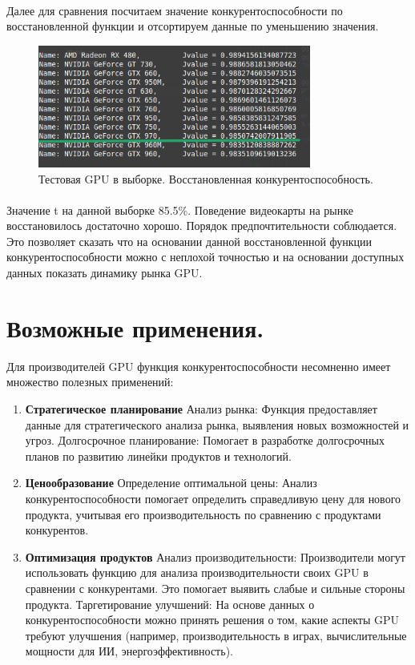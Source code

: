 \documentclass[14pt, a4paper]{extarticle}
\begin{document}
\paragraph{}
\newpage
Далее для сравнения посчитаем значение конкурентоспособности по восстановленной функции и отсортируем данные по уменьшению значения.
\begin{figure}[h]
    \centering
    \includegraphics[width=0.8\textwidth]{./img/linear/test_restored.png}
    \caption{Тестовая GPU в выборке. Восстановленная конкурентоспособность.}
    \label{fig:example}
\end{figure}
\paragraph{}
Значение t на данной выборке 85.5\%. Поведение видеокарты на рынке восстановилось достаточно хорошо. Порядок предпочтительности соблюдается. Это позволяет сказать что на основании данной восстановленной функции конкурентоспособности можно с неплохой точностью и на основании доступных данных показать динамику рынка GPU.
\newpage
\section{Возможные применения.}
Для производителей GPU функция конкурентоспособности несомненно имеет множество полезных применений:
\begin{enumerate}
  \item\textbf{Стратегическое планирование}
  \subitem Анализ рынка: Функция предоставляет данные для стратегического анализа рынка, выявления новых возможностей и угроз.
  \subitem Долгосрочное планирование: Помогает в разработке долгосрочных планов по развитию линейки продуктов и технологий.
  \item\textbf{Ценообразование}
  \subitem Определение оптимальной цены: Анализ конкурентоспособности помогает определить справедливую цену для нового продукта, учитывая его производительность по сравнению с продуктами конкурентов.
  \item\textbf{Оптимизация продуктов}
  \subitem Анализ производительности: Производители могут использовать функцию для анализа производительности своих GPU в сравнении с конкурентами. Это помогает выявить слабые и сильные стороны продукта.
  \subitem Таргетирование улучшений: На основе данных о конкурентоспособности можно принять решения о том, какие аспекты GPU требуют улучшения (например, производительность в играх, вычислительные мощности для ИИ, энергоэффективность).

\end{enumerate}
\newpage
\end{document}
